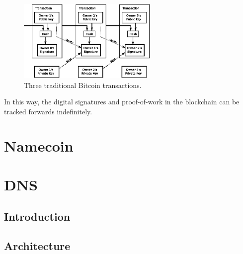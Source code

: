 
\begin{figure}[htbp]
	\centering
	\includegraphics[width=0.6\textwidth]{images/bitcoin_transaction.eps}
	\caption{Three traditional Bitcoin transactions.}
	\label{fig:figure1}
\end{figure}


In this way, the digital signatures and proof-of-work in the blockchain can be tracked forwards indefinitely. 






\section{Namecoin}




\section{DNS}

\subsection{Introduction}

\subsection{Architecture}